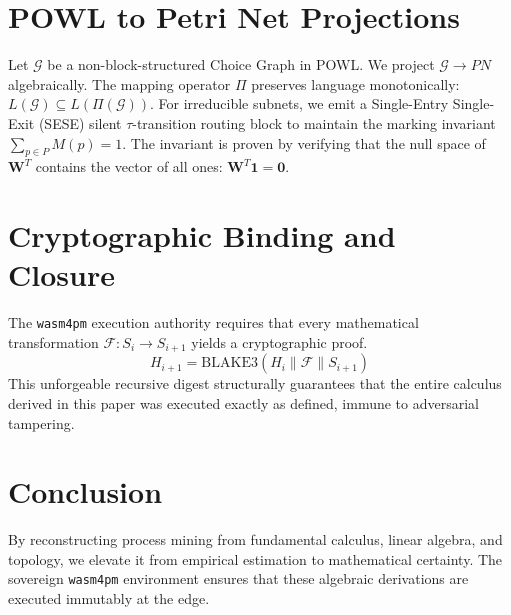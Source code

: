 \documentclass[11pt,a4paper,twocolumn]{article}
\begin{document}
\section{POWL to Petri Net Projections}
Let $\mathcal{G}$ be a non-block-structured Choice Graph in POWL. We project $\mathcal{G} \to PN$ algebraically. The mapping operator $\Pi$ preserves language monotonically: $L(\mathcal{G}) \subseteq L(\Pi(\mathcal{G}))$.
For irreducible subnets, we emit a Single-Entry Single-Exit (SESE) silent $\tau$-transition routing block to maintain the marking invariant $\sum_{p \in P} M(p) = 1$. The invariant is proven by verifying that the null space of $\mathbf{W}^T$ contains the vector of all ones: $\mathbf{W}^T \mathbf{1} = \mathbf{0}$.

\section{Cryptographic Binding and Closure}
The \texttt{wasm4pm} execution authority requires that every mathematical transformation $\mathcal{F}: S_i \to S_{i+1}$ yields a cryptographic proof.
\[ H_{i+1} = \text{BLAKE3}( H_i \parallel \mathcal{F} \parallel S_{i+1} ) \]
This unforgeable recursive digest structurally guarantees that the entire calculus derived in this paper was executed exactly as defined, immune to adversarial tampering.

\section{Conclusion}
By reconstructing process mining from fundamental calculus, linear algebra, and topology, we elevate it from empirical estimation to mathematical certainty. The sovereign \texttt{wasm4pm} environment ensures that these algebraic derivations are executed immutably at the edge.
\end{document}
